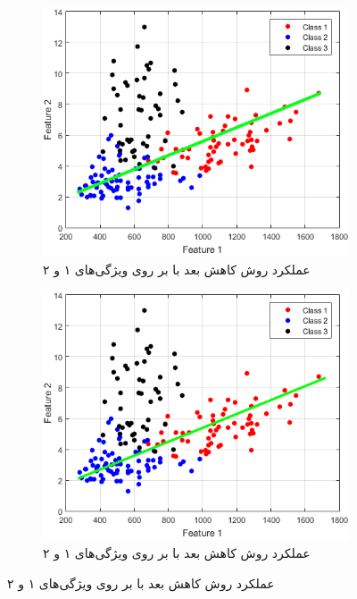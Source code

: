 \documentclass{article}
\begin{document}
\begin{figure}[h]
    \begin{subfigure}{0.3\linewidth}
        \centering
        \includegraphics[scale=0.15]{images/q2/pca.png}
        \caption{عملکرد روش کاهش بعد  با بر روی ویژگی‌های ۱ و ۲}
    \end{subfigure}
    \hfill
    \begin{subfigure}{0.3\linewidth}
        \centering
        \includegraphics[scale=0.15]{images/q2/fisher.png}
        \caption{عملکرد روش کاهش بعد  با بر روی ویژگی‌های ۱ و ۲}
    \end{subfigure}
    \hfill

\end{figure}
\end{document}
